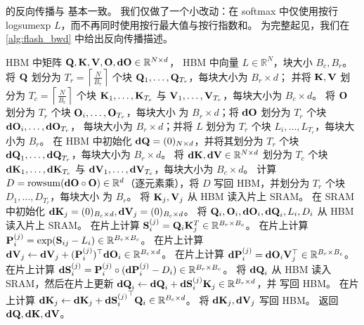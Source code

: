 \sysname 的反向传播与 \sysnameone 基本一致。
我们仅做了一个小改动：在 softmax 中仅使用按行 logsumexp $L$，而不再同时使用按行最大值与按行指数和。
为完整起见，我们在 \cref{alg:flash_bwd} 中给出反向传播描述。
\begin{algorithm}[h]
  \caption{\small\label{alg:flash_bwd}\sysname 反向传播}
  \begin{algorithmic}[1]
    \REQUIRE HBM 中矩阵 $\mathbf{Q}, \mathbf{K}, \mathbf{V}, \mathbf{O}, \mathbf{dO} \in \mathbb{R}^{N \times d}$，
    HBM 中向量 $L \in \mathbb{R}^N$，块大小 $B_c, B_r$。
    \STATE 将 $\mathbf{Q}$ 划分为 $T_r = \left\lceil\frac{N}{B_r} \right\rceil$ 个块 $\mathbf{Q}_1, \dots, \mathbf{Q}_{T_r}$，每块大小为 $B_r \times d$；
    并将 $\mathbf{K}, \mathbf{V}$ 划分为 $T_c = \left\lceil \frac{N}{B_c} \right\rceil$ 个块 $\mathbf{K}_1, \dots, \mathbf{K}_{T_c}$ 与
    $\mathbf{V}_1, \dots, \mathbf{V}_{T_c}$，每块大小为 $B_c \times d$。
    \STATE 将 $\mathbf{O}$ 划分为 $T_r$ 个块 $\mathbf{O}_i, \dots, \mathbf{O}_{T_r}$，每块大小
    为 $B_r \times d$；将 $\mathbf{dO}$ 划分为 $T_r$ 个块 $\mathbf{dO}_i, \dots, \mathbf{dO}_{T_r}$，
    每块大小为 $B_r \times d$；并将 $L$ 划分为 $T_r$ 个块 $L_i, \dots, L_{T_r}$，每块大小为
    $B_r$。
    \STATE 在 HBM 中初始化 $\mathbf{dQ} = (0)_{N \times d}$，并将其划分为 $T_r$ 个块 $\mathbf{dQ}_1, \dots, \mathbf{dQ}_{T_r}$，每块大小为 $B_r \times d$。
    将 $\mathbf{dK}, \mathbf{dV} \in \mathbb{R}^{N \times d}$ 划分为 $T_c$ 个块 $\mathbf{dK}_1, \dots, \mathbf{dK}_{T_c}$ 与
    $\mathbf{dV}_1, \dots, \mathbf{dV}_{T_c}$，每块大小为 $B_c \times d$。
    \STATE 计算 $D = \mathrm{rowsum}(\mathbf{dO} \circ \mathbf{O}) \in \mathbb{R}^d$（逐元素乘），将
    $D$ 写回 HBM，并划分为 $T_r$ 个块 $D_1, \dots, D_{T_r}$，每块大小
    为 $B_r$。
      \STATE 将 $\mathbf{K}_j, \mathbf{V}_j$ 从 HBM 读入片上 SRAM。
      \STATE 在 SRAM 中初始化 $\mathbf{dK}_j = (0)_{B_c \times d}, \mathbf{dV}_j = (0)_{B_c \times d}$。
        \STATE 将 $\mathbf{Q}_i, \mathbf{O}_i, \mathbf{dO}_i, \mathbf{dQ}_i, L_i, D_i$ 从 HBM 读入片上 SRAM。
        \STATE 在片上计算 $\mathbf{S}_{i}^{(j)} = \mathbf{Q}_i \mathbf{K}_j^T \in \mathbb{R}^{B_r \times B_c}$。
        \STATE 在片上计算 $\mathbf{P}_{i}^{(j)} = \exp(\mathbf{S}_{ij} - L_{i}) \in \mathbb{R}^{B_r \times B_c}$。
        \STATE 在片上计算
        $\mathbf{dV}_j \leftarrow \mathbf{dV}_j + (\mathbf{P}_{i}^{(j)})^\top \mathbf{dO}_i \in \mathbb{R}^{B_c \times d}$。
        \STATE 在片上计算
        $\mathbf{dP}_{i}^{(j)} = \mathbf{dO}_{i} \mathbf{V}_j^\top \in \mathbb{R}^{B_r \times B_c}$。
        \STATE 在片上计算 $\mathbf{dS}_{i}^{(j)} = \mathbf{P}_{i}^{(j)} \circ (\mathbf{dP}_{i}^{(j)} - D_i) \in \mathbb{R}^{B_r \times B_c}$。
        \STATE 将 $\mathbf{dQ}_i$ 从 HBM 读入 SRAM，然后在片上更新
        $\mathbf{dQ}_{i} \leftarrow \mathbf{dQ}_i + \mathbf{dS}_{i}^{(j)} \mathbf{K}_j \in \mathbb{R}^{B_r \times d}$，并
        写回 HBM。
        \STATE 在片上计算 $\mathbf{dK}_{j} \leftarrow \mathbf{dK}_j + {\mathbf{dS}_{i}^{(j)}}^\top \mathbf{Q}_i \in \mathbb{R}^{B_c \times d}$。
      \ENDFOR
      \STATE 将 $\mathbf{dK}_j, \mathbf{dV}_j$ 写回 HBM。
    \ENDFOR
    \STATE 返回 $\mathbf{dQ}, \mathbf{dK}, \mathbf{dV}$。
  \end{algorithmic}
\end{algorithm}

